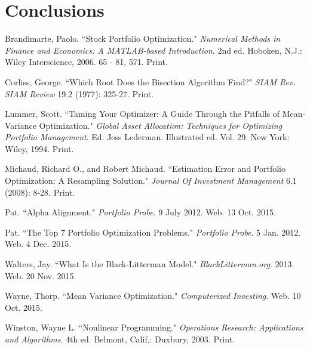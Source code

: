 \documentclass[12pt]{article}
\begin{document}
\section{Conclusions}
\clearpage

\begin{thebibliography}{10}
	 Brandimarte, Paolo. ``Stock Portfolio Optimization."  \emph{Numerical Methods in Finance and Economics: A MATLAB-based Introduction}. 2nd ed. Hoboken, N.J.: Wiley Interscience, 2006. 65 - 81, 571. Print.

	 Corliss, George. ``Which Root Does the Bisection Algorithm Find?" \emph{SIAM Rev. SIAM Review} 19.2 (1977): 325-27. Print.
	
	 Lummer, Scott. ``Taming Your Optimizer: A Guide Through the Pitfalls of Mean-Variance Optimization." \emph{Global Asset Allocation: Techniques for Optimizing Portfolio Management}. Ed. Jess Lederman. Illustrated ed. Vol. 29. New York: Wiley, 1994. Print.
	
	 Michaud, Richard O., and Robert Michaud. ``Estimation Error and Portfolio Optimization: A Resampling Solution." \emph{Journal Of Investment Management} 6.1 (2008): 8-28. Print.
	
	 Pat. ``Alpha Alignment." \emph{Portfolio Probe}. 9 July 2012. Web. 13 Oct. 2015.
	
	 Pat. ``The Top 7 Portfolio Optimization Problems."  \emph{Portfolio Probe}. 5 Jan. 2012. Web. 4 Dec. 2015.

	 Walters, Jay. ``What Is the Black-Litterman Model." \emph{BlackLitterman.org}. 2013. Web. 20 Nov. 2015.

	 Wayne, Thorp. ``Mean Variance Optimization."  \emph{Computerized Investing}. Web. 10 Oct. 2015.
	
	 Winston, Wayne L. ``Nonlinear Programming."  \emph{Operations Research: Applications and Algorithms}. 4th ed. Belmont, Calif.: Duxbury, 2003. Print.
\end{thebibliography}
\end{document}
